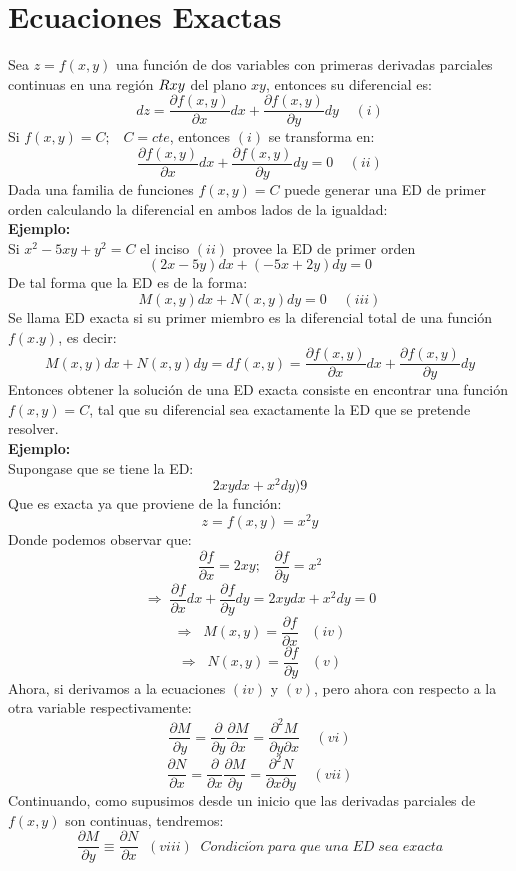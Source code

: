 \documentclass[10pt,executivepaper]{article}
\begin{document}
\section{Ecuaciones Exactas}
Sea $z=f(x,y)$ una función de dos variables con primeras derivadas parciales continuas en una región $R\tiny{xy}$ del plano $xy$, entonces su diferencial es:
\[dz=\frac{\partial{f(x,y)}}{\partial{x}}dx+\frac{\partial{f(x,y)}}{\partial{y}}dy\;\;\;\;(i)\]
Si $f(x,y)=C;\;\;\;C=cte$, entonces $(i)$ se transforma en:
\[\frac{\partial{f(x,y)}}{\partial{x}}dx+\frac{\partial{f(x,y)}}{\partial{y}}dy=0\;\;\;\;(ii)\]
Dada una familia de funciones $f(x,y)=C$ puede generar una ED de primer orden calculando la diferencial en ambos lados de la igualdad:
\\
\textbf{Ejemplo:}
\\
Si $x^{2}-5xy+y^{2}=C$ el inciso $(ii)$ provee la ED de primer orden
\[(2x-5y)dx+(-5x+2y)dy=0\]
De tal forma que la ED es de la forma:
\[M(x,y)dx+N(x,y)dy=0\;\;\;\;(iii)\]
Se llama ED exacta si su primer miembro es la diferencial total de una función $f(x.y)$, es decir:
\[M(x,y)dx+N(x,y)dy=df(x,y)=\frac{\partial{f(x,y)}}{\partial{x}}dx+\frac{\partial{f(x,y)}}{\partial{y}}dy\]
Entonces obtener la solución de una ED exacta consiste en encontrar una función $f(x,y)=C$, tal que su diferencial sea exactamente la ED que se pretende resolver.
\\
\textbf{Ejemplo:}
\\
Supongase que se tiene la ED:
\[2xydx+x^{2}dy)9\]
Que es exacta ya que proviene de la función:
\[z=f(x,y)=x^{2}y\]
Donde podemos observar que:
\[\frac{\partial{f}}{\partial{x}}=2xy;\;\;\;\frac{\partial{f}}{\partial{y}}=x^{2}\]
\[\Rightarrow\;\frac{\partial{f}}{\partial{x}}dx+\frac{\partial{f}}{\partial{y}}dy=2xydx+x^{2}dy=0\]
\[\Rightarrow\;\;M(x,y)=\frac{\partial{f}}{\partial{x}}\;\;\;(iv)\]
\[\Rightarrow\;\;N(x,y)=\frac{\partial{f}}{\partial{y}}\;\;\;(v)\]
Ahora, si derivamos a la ecuaciones $(iv)$ y $(v)$, pero ahora con respecto a la otra variable respectivamente:
\[\frac{\partial{M}}{\partial{y}}=\frac{\partial}{\partial{y}}\frac{\partial{M}}{\partial{x}}=\frac{\partial^{2}{M}}{\partial{y}\partial{x}}\;\;\;\;(vi)\]
\[\frac{\partial{N}}{\partial{x}}=\frac{\partial}{\partial{x}}\frac{\partial{M}}{\partial{y}}=\frac{\partial^{2}{N}}{\partial{x}\partial{y}}\;\;\;\;(vii)\]
Continuando, como supusimos desde un inicio que las derivadas parciales de $f(x,y)$ son continuas, tendremos:
\[\frac{\partial{M}}{\partial{y}}\equiv \frac{\partial{N}}{\partial{x}}\;\;(viii)\;\;Condici\acute{o}n\;para\;que\;una\;ED\;sea\;exacta\]
\end{document}
